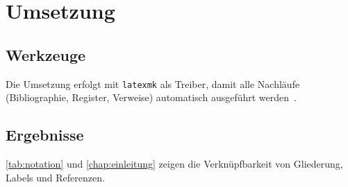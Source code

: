 \chapter{Umsetzung}
\label{chap:umsetzung}

\section{Werkzeuge}
\label{sec:werkzeuge}
Die Umsetzung erfolgt mit \texttt{latexmk} als Treiber, damit alle
Nachläufe (Bibliographie, Register, Verweise) automatisch ausgeführt
werden~\cite{kopka2003}.

\section{Ergebnisse}
\label{sec:ergebnisse}
\cref{tab:notation} und \cref{chap:einleitung} zeigen die Verknüpfbarkeit
von Gliederung, Labels und Referenzen.
